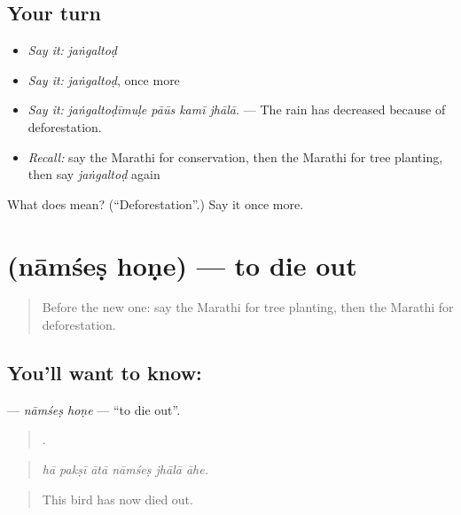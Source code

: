 \subsection*{Your turn}
\begin{itemize}
\raggedright
  \item \emph{Say it:} \emph{jaṅgaltoḍ}
  \item \emph{Say it:} \emph{jaṅgaltoḍ}, once more
  \item \emph{Say it:} \emph{jaṅgaltoḍīmuḷe pāūs kamī jhālā.} — The rain has decreased because of deforestation.
  \item \emph{Recall:} say the Marathi for conservation, then the Marathi for tree planting, then say \emph{jaṅgaltoḍ} again
\end{itemize}

\begin{tcolorbox}[breakable,colback=teal!4,colframe=teal!35!black,title={Before you move on}]
What does  mean? (\textquotedblleft{}Deforestation\textquotedblright{}.) Say it once more.
\end{tcolorbox}
\section[\texorpdfstring{\mr{नामशेष} \mr{होणे} (nāmśeṣ hoṇe)}{नामशेष होणे (nāmśeṣ hoṇe)}]{  (nāmśeṣ hoṇe) — to die out}

\label{lesson:MR-C449-namses-hone}



\begin{quote}
Before the new one: say the Marathi for tree planting, then the Marathi for deforestation.
\end{quote}

\subsection*{You'll want to know:  }
\textbf{ } — \emph{nāmśeṣ hoṇe} — \textquotedblleft{}to die out\textquotedblright{}.

\begin{quote}
     .
\end{quote}

\begin{quote}
\emph{hā pakṣī ātā nāmśeṣ jhālā āhe.}
\end{quote}

\begin{quote}
This bird has now died out.
\end{quote}

